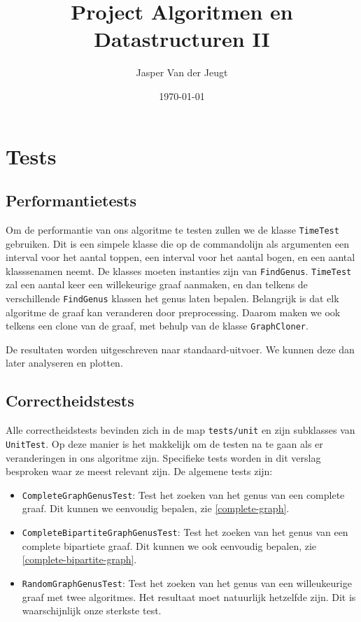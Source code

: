 \documentclass{article}
\title{Project Algoritmen en Datastructuren II}
\author{Jasper Van der Jeugt}
\date{\today}
\begin{document}
\maketitle
\tableofcontents

\section{Tests}

\subsection{Performantietests}
Om de performantie van ons algoritme te testen zullen we de klasse
\verb#TimeTest# gebruiken. Dit is een simpele klasse die op de commandolijn als
argumenten een interval voor het aantal toppen, een interval voor het aantal
bogen, en een aantal klasssenamen neemt. De klasses moeten instanties zijn van
\verb#FindGenus#. \verb#TimeTest# zal een aantal keer een willekeurige graaf
aanmaken, en dan telkens de verschillende \verb#FindGenus# klassen het genus
laten bepalen. Belangrijk is dat elk algoritme de graaf kan veranderen door
preprocessing. Daarom maken we ook telkens een clone van de graaf, met behulp
van de klasse \verb#GraphCloner#.
\newline

De resultaten worden uitgeschreven naar standaard-uitvoer. We kunnen deze dan
later analyseren en plotten.

\subsection{Correctheidstests}
\label{correctheidstests}
Alle correctheidstests bevinden zich in de map \verb#tests/unit# en zijn
subklasses van \verb#UnitTest#. Op deze manier is het makkelijk om de testen na
te gaan als er veranderingen in ons algoritme zijn. Specifieke tests worden
in dit verslag besproken waar ze meest relevant zijn. De algemene tests zijn:
\begin{itemize}
\item \verb#CompleteGraphGenusTest#: Test het zoeken van het genus van een
complete graaf. Dit kunnen we eenvoudig bepalen, zie \ref{complete-graph}.
\item \verb#CompleteBipartiteGraphGenusTest#: Test het zoeken van het genus van
een complete bipartiete graaf. Dit kunnen we ook eenvoudig bepalen, zie 
\ref{complete-bipartite-graph}.
\item \verb#RandomGraphGenusTest#: Test het zoeken van het genus van een
willeukeurige graaf met twee algoritmes. Het resultaat moet natuurlijk
hetzelfde zijn. Dit is waarschijnlijk onze sterkste test.
\end{itemize}
\end{document}
